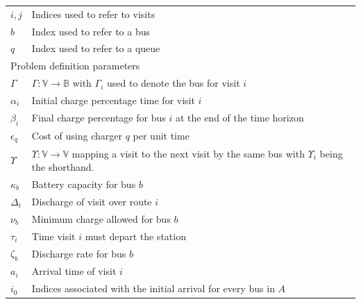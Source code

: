 \documentclass[ee,msthesis]{usuthesis}
\begin{document}
\begin{table}[!htpb]
\begin{tabularx}{\textwidth}{l l}
    $i,j$        & Indices used to refer to visits                                                                         \\
    $b$ 	 & Index used to refer to a bus                                                                            \\
    $q$ 	 & Index used to refer to a queue                                                                          \\
    \hline
    \multicolumn{2}{l}{Problem definition parameters}                                                                      \\
    $\Gamma$   & $\Gamma: \mathbb{V} \rightarrow \mathbb{B}$ with $\Gamma_i$ used to denote the bus for visit $i$                                   \\
    $\alpha_i$ & Initial charge percentage time for visit $i$                                                                   \\
    $\beta_i$ & Final charge percentage for bus $i$ at the end of the time horizon                                             \\
    $\epsilon_q$ & Cost of using charger $q$ per unit time                                                                        \\
    $\Upsilon$   & $\Upsilon: \mathbb{V} \rightarrow \mathbb{V}$ mapping a visit to the next visit by the same bus with $\Upsilon_i$ being the shorthand. \\
    $\kappa_b$ & Battery capacity for bus $b$                                                                                   \\
    $\Delta_i$ & Discharge of visit over route $i$                                                                              \\
    $\nu_b$ & Minimum charge allowed for bus $b$                                                                             \\
    $\tau_i$ & Time visit $i$ must depart the station                                                                         \\
    $\zeta_b$ & Discharge rate for bus $b$                                                                                     \\
    $a_i$ & Arrival time of visit  $i$                                                                                     \\
    $i_0$ & Indices associated with the initial arrival for every bus in $A$                                               \\

\end{tabularx}
\end{table}
\end{document}
